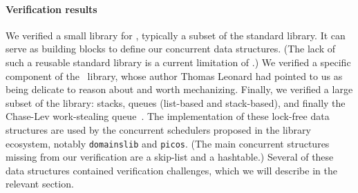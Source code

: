 \paragraph{Verification results} We verified a small library for \ZooLang, typically a subset of the \OCaml standard library. It can serve as building blocks to define our concurrent data structures. (The lack of such a reusable standard library is a current limitation of \HeapLang.) We verified a specific component of the \Eio~library, whose author Thomas Leonard had pointed to us as being delicate to reason about and worth mechanizing. Finally, we verified a large subset of the \Saturn library: stacks, queues (list-based and stack-based), and finally the Chase-Lev work-stealing queue~\citep*{DBLP:conf/spaa/ChaseL05}. The \Saturn implementation of these lock-free data structures are used by the concurrent schedulers proposed in the \OCamlFive library ecosystem, notably \texttt{domainslib} and \texttt{picos}. (The main \Saturn concurrent structures missing from our verification are a skip-list and a hashtable.) Several of these data structures contained verification challenges, which we will describe in the relevant section.

